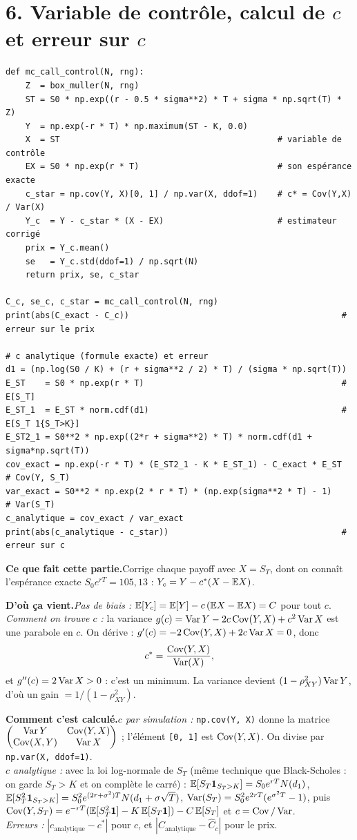 \documentclass[11pt,a4paper]{article}
\newcommand{\quoi}[1]{\par\noindent\textbf{\color{bleu}Ce que fait cette partie.}\enspace #1\par}
\newcommand{\source}[1]{\par\noindent\textbf{\color{orange}D'où ça vient.}\enspace #1\par}
\newcommand{\calcul}[1]{\par\noindent\textbf{\color{bleu}Comment c'est calculé.}\enspace #1\par}
\newcommand{\sect}[1]{\clearpage\section{#1}}
\begin{document}
\sect{6. Variable de contrôle, calcul de $c$ et erreur sur $c$}
\begin{lstlisting}
def mc_call_control(N, rng):
    Z  = box_muller(N, rng)
    ST = S0 * np.exp((r - 0.5 * sigma**2) * T + sigma * np.sqrt(T) * Z)
    Y  = np.exp(-r * T) * np.maximum(ST - K, 0.0)
    X  = ST                                            # variable de contrôle
    EX = S0 * np.exp(r * T)                            # son espérance exacte
    c_star = np.cov(Y, X)[0, 1] / np.var(X, ddof=1)    # c* = Cov(Y,X) / Var(X)
    Y_c  = Y - c_star * (X - EX)                       # estimateur corrigé
    prix = Y_c.mean()
    se   = Y_c.std(ddof=1) / np.sqrt(N)
    return prix, se, c_star

C_c, se_c, c_star = mc_call_control(N, rng)
print(abs(C_exact - C_c))                                           # erreur sur le prix

# c analytique (formule exacte) et erreur
d1 = (np.log(S0 / K) + (r + sigma**2 / 2) * T) / (sigma * np.sqrt(T))
E_ST    = S0 * np.exp(r * T)                                        # E[S_T]
E_ST_1  = E_ST * norm.cdf(d1)                                       # E[S_T 1{S_T>K}]
E_ST2_1 = S0**2 * np.exp((2*r + sigma**2) * T) * norm.cdf(d1 + sigma*np.sqrt(T))
cov_exact = np.exp(-r * T) * (E_ST2_1 - K * E_ST_1) - C_exact * E_ST   # Cov(Y, S_T)
var_exact = S0**2 * np.exp(2 * r * T) * (np.exp(sigma**2 * T) - 1)     # Var(S_T)
c_analytique = cov_exact / var_exact
print(abs(c_analytique - c_star))                                   # erreur sur c
\end{lstlisting}
\quoi{Corrige chaque payoff avec $X = S_T$, dont on connaît l'espérance exacte $S_0e^{rT} = 105{,}13$ : $Y_c = Y - c^*(X - \mathbb{E} X)$.}
\source{\emph{Pas de biais :} $\mathbb{E}[Y_c] = \mathbb{E}[Y] - c\,(\mathbb{E} X - \mathbb{E} X) = C$ pour tout $c$.
\emph{Comment on trouve $c$ :} la variance $g(c) = \operatorname{Var} Y - 2c\operatorname{Cov}(Y,X) + c^2\operatorname{Var} X$ est une parabole en $c$. On dérive : $g'(c) = -2\operatorname{Cov}(Y,X) + 2c\operatorname{Var} X = 0$, donc
\[ c^* = \frac{\operatorname{Cov}(Y,X)}{\operatorname{Var}(X)}, \]
et $g''(c) = 2\operatorname{Var} X>0$ : c'est un minimum. La variance devient $(1-\rho_{XY}^2)\operatorname{Var} Y$, d'où un gain $= 1/(1-\rho_{XY}^2)$.}
\calcul{\emph{$c$ par simulation :} \texttt{np.cov(Y, X)} donne la matrice $\begin{pmatrix}\operatorname{Var} Y & \operatorname{Cov}(Y,X)\\ \operatorname{Cov}(X,Y) & \operatorname{Var} X\end{pmatrix}$ ; l'élément \texttt{[0, 1]} est $\operatorname{Cov}(Y,X)$. On divise par \texttt{np.var(X, ddof=1)}.\\
\emph{$c$ analytique :} avec la loi log-normale de $S_T$ (même technique que Black-Scholes : on garde $S_T>K$ et on complète le carré) : $\mathbb{E}[S_T\mathbf{1}_{S_T>K}] = S_0e^{rT}N(d_1)$, $\mathbb{E}[S_T^2\mathbf{1}_{S_T>K}] = S_0^2e^{(2r+\sigma^2)T}N(d_1+\sigma\sqrt T)$, $\operatorname{Var}(S_T) = S_0^2e^{2rT}(e^{\sigma^2T}-1)$, puis $\operatorname{Cov}(Y,S_T) = e^{-rT}(\mathbb{E}[S_T^2\mathbf{1}] - K\,\mathbb{E}[S_T\mathbf{1}]) - C\,\mathbb{E}[S_T]$ et $c = \operatorname{Cov}/\operatorname{Var}$.\\
\emph{Erreurs :} $|c_{\text{analytique}} - c^*|$ pour $c$, et $|C_{\text{analytique}} - \hat C_c|$ pour le prix.}
\end{document}
